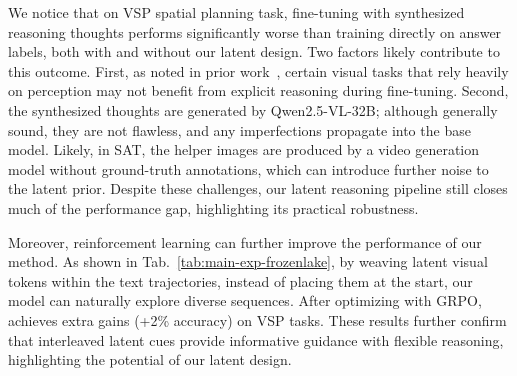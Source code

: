 \begin{table}[t]
    \centering
    \caption{\textbf{Experimental Results with Qwen2.5-VL 3B on COMT, Jigsaw, and SAT tasks.}}
    \label{tab:main-exp-spatial-3B}
\end{table}


We notice that on VSP spatial planning task, fine-tuning with synthesized reasoning thoughts performs significantly worse than training directly on answer labels, both with and without our latent design. Two factors likely contribute to this outcome. First, as noted in prior work~\citep{li2025think}, certain visual tasks that rely heavily on perception may not benefit from explicit reasoning during fine-tuning. Second, the synthesized thoughts are generated by Qwen2.5-VL-32B; although generally sound, they are not flawless, and any imperfections propagate into the base model. Likely, in SAT, the helper images are produced by a video generation model without ground-truth annotations, which can introduce further noise to the latent prior. Despite these challenges, our latent reasoning pipeline still closes much of the performance gap, highlighting its practical robustness.

Moreover, reinforcement learning can further improve the performance of our method. As shown in Tab.~\ref{tab:main-exp-frozenlake}, by weaving latent visual tokens within the text trajectories, instead of placing them at the start, our model can naturally explore diverse sequences. After optimizing with GRPO, \Model achieves extra gains (+2\% accuracy) on VSP tasks. These results further confirm that interleaved latent cues provide informative guidance with flexible reasoning, highlighting the potential of our latent design.

